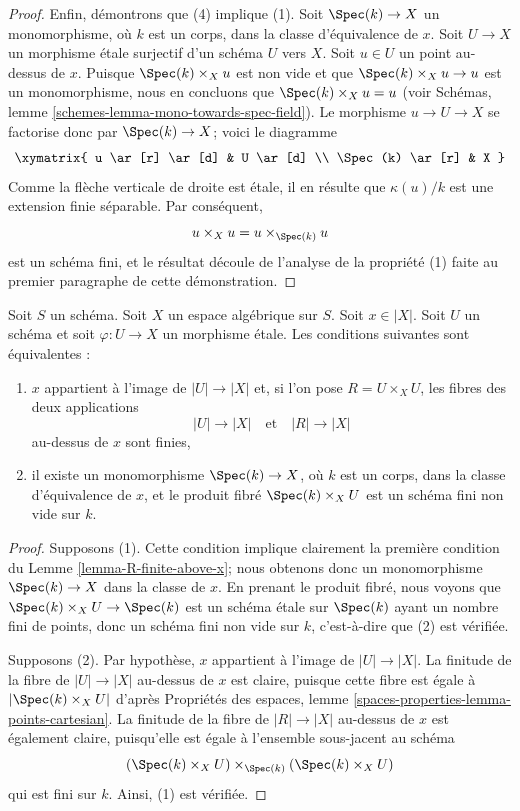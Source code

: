 \begin{proof}
\medskip\noindent
Enfin, démontrons que (4) implique (1). Soit $\Spec(k) \to X$
un monomorphisme, où $k$ est un corps, dans la classe d'équivalence de $x$.
Soit $U \to X$ un morphisme étale surjectif d'un schéma $U$ vers $X$.
Soit $u \in U$ un point au-dessus de $x$. Puisque $\Spec(k) \times_X u$
est non vide et que $\Spec(k) \times_X u \to u$ est un monomorphisme,
nous en concluons que $\Spec(k) \times_X u = u$ (voir
Schémas, lemme \ref{schemes-lemma-mono-towards-spec-field}).
Le morphisme $u \to U \to X$ se factorise donc par $\Spec(k) \to X$; voici
le diagramme
$$
\xymatrix{
u \ar[r] \ar[d] & U \ar[d] \\
\Spec(k) \ar[r] & X
}
$$
Comme la flèche verticale de droite est étale, il en résulte que
$\kappa(u)/k$ est une extension finie séparable. Par conséquent,
$$
u \times_X u = u \times_{\Spec(k)} u
$$
est un schéma fini, et le résultat découle de l'analyse de la propriété (1)
faite au premier paragraphe de cette démonstration.
\end{proof}

\begin{lemma}
\label{lemma-weak-UR-finite-above-x}
Soit $S$ un schéma. Soit $X$ un espace algébrique sur $S$.
Soit $x \in |X|$.
Soit $U$ un schéma et soit $\varphi : U \to X$ un morphisme étale.
Les conditions suivantes sont équivalentes :
\begin{enumerate}
\item $x$ appartient à l'image de $|U| \to |X|$ et, si l'on pose
$R = U \times_X U$, les fibres des deux applications
$$
|U| \longrightarrow |X|
\quad\text{et}\quad
|R| \longrightarrow |X|
$$
au-dessus de $x$ sont finies,
\item il existe un monomorphisme $\Spec(k) \to X$, où $k$ est un corps,
dans la classe d'équivalence de $x$, et
le produit fibré $\Spec(k) \times_X U$ est
un schéma fini non vide sur $k$.
\end{enumerate}
\end{lemma}

\begin{proof}
Supposons (1). Cette condition implique clairement la première condition du
Lemme \ref{lemma-R-finite-above-x}; nous obtenons donc un monomorphisme
$\Spec(k) \to X$ dans la classe de $x$. En prenant le produit fibré,
nous voyons que $\Spec(k) \times_X U \to \Spec(k)$ est un schéma
étale sur $\Spec(k)$ ayant un nombre fini de points, donc un schéma fini
non vide sur $k$, c'est-à-dire que (2) est vérifiée.

\medskip\noindent
Supposons (2). Par hypothèse, $x$ appartient à l'image de
$|U| \to |X|$. La finitude de la fibre de
$|U| \to |X|$ au-dessus de $x$ est claire, puisque cette fibre est égale à
$|\Spec(k) \times_X U|$ d'après
Propriétés des espaces,
lemme \ref{spaces-properties-lemma-points-cartesian}.
La finitude de la fibre de $|R| \to |X|$ au-dessus de $x$ est également
claire, puisqu'elle est égale à l'ensemble sous-jacent au schéma
$$
(\Spec(k) \times_X U) \times_{\Spec(k)} (\Spec(k) \times_X U)
$$
qui est fini sur $k$. Ainsi, (1) est vérifiée.
\end{proof}

